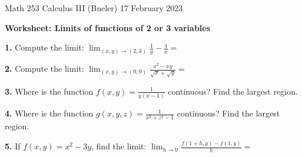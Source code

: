 \documentclass[11pt]{amsart}
\newcommand{\prob}[1]{\bigskip\noindent\textbf{#1.}\quad }
\newcommand{\ds}{\displaystyle}
\begin{document}
\scriptsize \noindent Math 253 Calculus III (Bueler) \hfill 17 February 2023 
\normalsize\medskip

\Large\centerline{\textbf{Worksheet: Limits of functions of 2 or 3 variables}}
\medskip
\normalsize

\thispagestyle{empty}

\bigskip

\prob{1}  Compute the limit:  \quad $\ds \lim_{(x,y) \to (2,3)} \frac{1}{y} - \frac{4}{x} =$
\vfill

\prob{2}  Compute the limit:  \quad $\ds \lim_{(x,y) \to (0,0)} \frac{x^2-xy}{\sqrt{x}+\sqrt{y}} =$
\vfill

\prob{3}  Where is the function $\ds f(x,y) = \frac{1}{y(x-1)}$ continuous?  Find the largest region.
\vfill

\prob{4}  Where is the function $\ds g(x,y,z) = \frac{1}{x^2+z^2-1}$ continuous?  Find the largest region.
\vfill

\prob{5}  If $f(x,y)=x^2 - 3y$, find the limit:  \quad $\ds \lim_{h\to 0} \frac{f(1+h,y) - f(1,y)}{h} =$
\vfill
\end{document}
